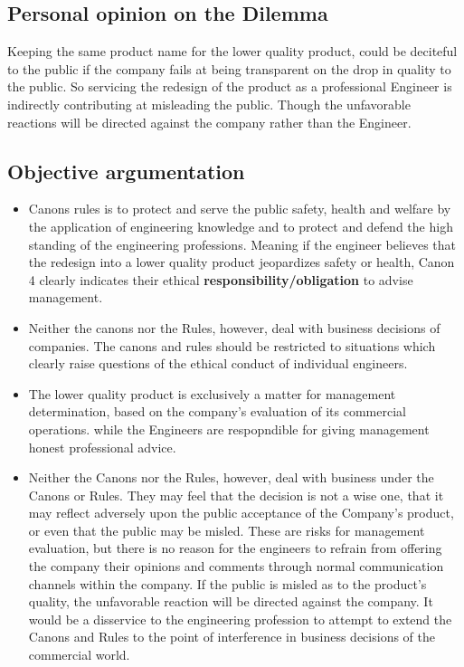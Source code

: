 \documentclass[11pt, a4paper]{article}
\begin{document}
\subsection{Personal opinion on the Dilemma}
Keeping the same product name for the lower quality product, could be deciteful to the
public if the company fails at being transparent on the drop in quality to the public. So
servicing the redesign of the product  as a professional Engineer is indirectly
contributing at misleading the public. Though the unfavorable reactions will be directed against the company rather than the Engineer.

\subsection{Objective argumentation}
\begin{itemize}
  \item Canons rules is to protect and serve the public safety, health and welfare by the
        application of engineering knowledge and to protect and defend the high standing of the
        engineering professions. Meaning if the engineer believes that the redesign into a lower
        quality product jeopardizes safety or health, Canon 4 clearly indicates their
        ethical \textbf{responsibility/obligation} to advise management.

  \item Neither the canons nor the Rules, however, deal with business decisions of companies.
        The canons and rules should be restricted to situations which clearly raise questions of
        the ethical conduct of individual engineers.

  \item The lower quality product is exclusively a matter for management determination, based on
        the company's evaluation of its commercial operations. while the Engineers are
        respopndible for giving management honest professional advice.
  \item Neither the Canons nor the Rules, however, deal with business under the Canons or Rules. They may feel that the decision is not a wise one, that it may reflect adversely upon the public acceptance of the Company's product, or even that the public may be misled. These are risks for management evaluation, but there is no reason for the engineers to refrain from offering the company their opinions and comments through normal communication channels within the company. If the public is misled as to the product's quality, the unfavorable reaction will be directed against the company. It would be a disservice to the engineering profession to attempt to extend the Canons and Rules to the point of interference in business decisions of the commercial world.



\end{itemize}
\end{document}
